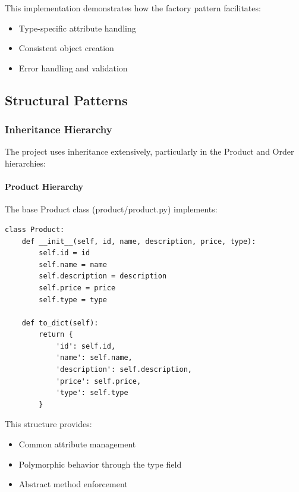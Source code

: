 \documentclass[12pt,a4paper]{article}
\begin{document}
This implementation demonstrates how the factory pattern facilitates:
\begin{itemize}
    \item Type-specific attribute handling
    \item Consistent object creation
    \item Error handling and validation
\end{itemize}

\subsection{Structural Patterns}

\subsubsection{Inheritance Hierarchy}
The project uses inheritance extensively, particularly in the Product and Order hierarchies:

\paragraph{Product Hierarchy}
The base Product class (product/product.py) implements:
\begin{verbatim}
class Product:
    def __init__(self, id, name, description, price, type):
        self.id = id
        self.name = name
        self.description = description
        self.price = price
        self.type = type

    def to_dict(self):
        return {
            'id': self.id,
            'name': self.name,
            'description': self.description,
            'price': self.price,
            'type': self.type
        }
\end{verbatim}

This structure provides:
\begin{itemize}
    \item Common attribute management
    \item Polymorphic behavior through the type field
    \item Abstract method enforcement
\end{itemize}
\end{document}
